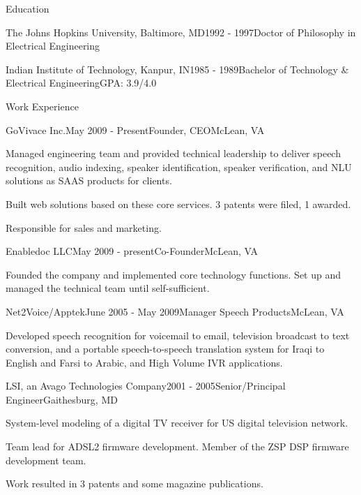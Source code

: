 \documentclass{template} %
\begin{document}

\begin{rSection}{Education}
\begin{rSubsection}{The Johns Hopkins University, Baltimore, MD}{1992 - 1997}{Doctor of Philosophy in Electrical Engineering}{}
\end{rSubsection}
\vspace{-0.2cm}
\begin{rSubsection}{Indian Institute of Technology, Kanpur, IN}{1985 - 1989}{Bachelor of Technology \& Electrical Engineering}{GPA: 3.9/4.0}
\end{rSubsection}
\vspace{-0.2cm}
\end{rSection}


\begin{rSection}{Work Experience}

\begin{rSubsection}{GoVivace Inc.}{May 2009 - Present}{Founder, CEO}{McLean, VA}
\item Managed engineering team and provided technical leadership to deliver speech recognition, audio indexing, speaker identification, speaker verification, and NLU solutions as SAAS products for clients.
\item Built web solutions based on these core services. 3 patents were filed, 1 awarded.
\item Responsible for sales and marketing.
\end{rSubsection}

\begin{rSubsection}{Enabledoc LLC}{May 2009 - present}{Co-Founder}{McLean, VA}
\item Founded the company and implemented core technology functions. Set up and managed the technical team until self-sufficient.
\end{rSubsection}

\begin{rSubsection}{Net2Voice/Apptek}{June 2005 - May 2009}{Manager Speech Products}{McLean, VA}
\item Developed speech recognition for voicemail to email, television broadcast to text conversion, and a portable speech-to-speech translation system for Iraqi to English and Farsi to Arabic, and High Volume IVR applications.
\end{rSubsection}

\begin{rSubsection}{LSI, an Avago Technologies Company}{2001 - 2005}{Senior/Principal Engineer}{Gaithesburg, MD}
\item System-level modeling of a digital TV receiver for US digital television network. \item Team lead for ADSL2 firmware development. Member of the ZSP DSP firmware development team. 
\item Work resulted in 3 patents and some magazine publications.
\end{rSubsection}


\end{rSection}
\end{document}
